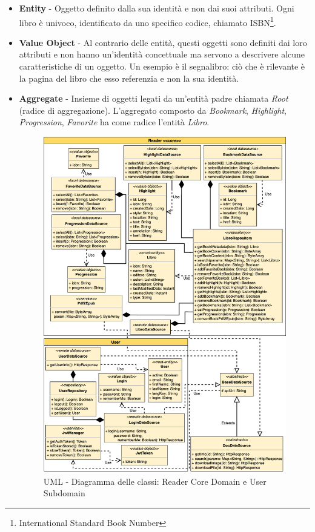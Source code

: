 \begin{itemize}
    \item \textbf{Entity} - Oggetto definito dalla sua identità e non dai suoi attributi. Ogni libro è univoco, identificato da uno specifico codice, chiamato ISBN\footnote{International Standard Book Number}.
    
    \item \textbf{Value Object} - Al contrario delle entità, questi oggetti sono definiti dai loro attributi e non hanno un'identità concettuale ma servono a descrivere alcune caratteristiche di un oggetto. Un esempio è il segnalibro: ciò che è rilevante è la pagina del libro che esso referenzia e non la sua identità.
    
    \item \textbf{Aggregate} - Insieme di oggetti legati da un'entità padre chiamata \textit{Root} (radice di aggregazione). L'aggregato composto da \textit{Bookmark}, \textit{Highlight}, \textit{Progression}, \textit{Favorite} ha come radice l'entità \textit{Libro}.

    \begin{figure}[H]
        \centering
        \includegraphics[width=1\textwidth]{img/class-uml-app.png}
        \caption{UML - Diagramma delle classi: Reader Core Domain e User Subdomain}
        \label{class-uml-app}
    \end{figure}


\end{itemize}
